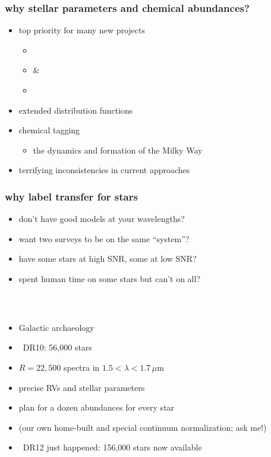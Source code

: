 \documentclass[pdftex]{beamer}
\begin{document}
\begin{frame}
  \frametitle{why stellar parameters and chemical abundances?}
  \begin{itemize}
  \item top priority for many new projects
    \begin{itemize}
    \item \gaia
    \item {} \& 
    \item \sdssiii\ \apogee
    \end{itemize}
  \item extended distribution functions
  \item chemical tagging
    \begin{itemize}
    \item the dynamics and formation of the Milky Way
    \end{itemize}
  \item terrifying inconsistencies in current approaches
  \end{itemize}
\end{frame}

\begin{frame}
  \frametitle{why label transfer for stars}
  \begin{itemize}
  \item don't have good models at your wavelengths?
  \item want two surveys to be on the same ``system''?
  \item have some stars at high SNR, some at low SNR?
  \item spent human time on some stars but can't on all?
  \end{itemize}
\end{frame}

\begin{frame}
  \frametitle{\sdssiii\ \apogee}
  \begin{itemize}
  \item Galactic archaeology
  \item \apogee\ DR10: 56,000 stars
  \item $R=22,500$ spectra in $1.5<\lambda<1.7\,\mu\mathrm{m}$
  \item precise RVs and stellar parameters
  \item plan for a dozen abundances for every star
  \item (our own home-built and special continuum normalization; ask me!)
  \item \apogee\ DR12 just happened: 156,000 stars now available
  \end{itemize}
\end{frame}
\end{document}
